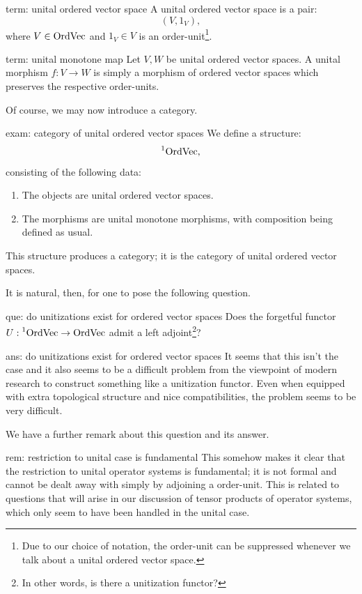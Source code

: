 \documentclass[main.tex]{subfiles}
\begin{document}
\begin{terminology}{}{term: unital ordered vector space}
A unital ordered vector space is a pair:
\[(V,1_V),\]
where $V \in \text{OrdVec}$ and $1_V \in V$ is an order-unit\footnote{Due to our choice of notation, the order-unit can be suppressed whenever we talk about a unital ordered vector space.}.
\end{terminology}

\begin{terminology}{}{term: unital monotone map}
Let $V,W$ be unital ordered vector spaces. A unital morphism $f: V \to W$ is simply a morphism of ordered vector spaces which preserves the respective order-units. 
\end{terminology}

Of course, we may now introduce a category. 

\begin{example}{}{exam: category of unital ordered vector spaces}
We define a structure: 
\[\prescript{1}{}{\text{OrdVec}},\]    
consisting of the following data: 
\begin{enumerate}
    \item The objects are unital ordered vector spaces. 
    \item The morphisms are unital monotone morphisms, with composition being defined as usual. 
\end{enumerate}
This structure produces a category; it is the category of unital ordered vector spaces. 
\end{example}

It is natural, then, for one to pose the following question. 

\begin{Question}{}{que: do unitizations exist for ordered vector spaces}
Does the forgetful functor $U: \prescript{1}{}{\text{OrdVec}} \to \text{OrdVec}$ admit a left adjoint\footnote{In other words, is there a unitization functor?}?
\end{Question}
\begin{Answer}{}{ans: do unitizations exist for ordered vector spaces}
It seems that this isn't the case and it also seems to be a difficult problem from the viewpoint of modern research to construct something like a unitization functor. Even when equipped with extra topological structure and nice compatibilities, the problem seems to be very difficult. 
\end{Answer}

We have a further remark about this question and its answer. 

\begin{remark}{}{rem: restriction to unital case is fundamental}
This somehow makes it clear that the restriction to unital operator systems is fundamental; it is not formal and cannot be dealt away with simply by adjoining a order-unit. This is related to questions that will arise in our discussion of tensor products of operator systems, which only seem to have been handled in the unital case. 
\end{remark}
\end{document}
